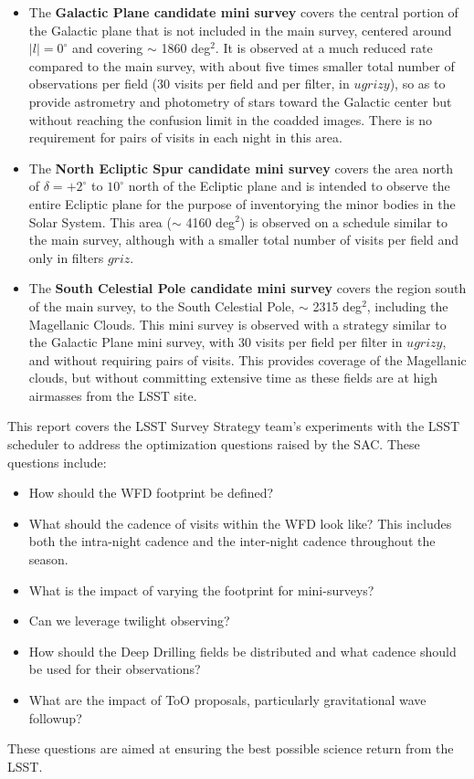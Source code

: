 \begin{itemize}
science, providing a `gold sample' to calibrate the main survey, and to discover Type Ia supernovae.
\item The {\bf Galactic Plane candidate mini survey} covers the central portion of the Galactic plane that is not included in the main survey,
centered around $|l| = 0^\circ$ and covering $\sim$ 1860 deg$^2$.  It is observed at a much reduced rate compared to the main survey,
with about five times smaller total number of observations per field (30 visits per field and per filter, in $ugrizy$), so as to
provide astrometry and photometry of stars toward the Galactic center but without reaching the confusion limit in the coadded images.
There is no requirement for pairs of visits in each night in this area.
\item The {\bf North Ecliptic Spur candidate mini survey} covers the area north of $\delta = +2^\circ$ to $10^\circ$ north of the Ecliptic plane
and is intended to observe the entire Ecliptic plane for the purpose of inventorying the minor bodies in the Solar System. This area ($\sim$ 4160 deg$^2$)
is observed on a schedule similar to the main survey, although with a smaller total number of visits per field and only in filters $griz$.
\item The {\bf South Celestial Pole candidate mini survey} covers the region south of the main survey, to the South Celestial Pole, $\sim$ 2315 deg$^2$,
including the Magellanic Clouds.
This mini survey is observed with a strategy similar to the Galactic Plane mini survey, with 30 visits per field per filter in $ugrizy$,
and without requiring pairs of visits. This provides coverage of the Magellanic clouds, but without committing extensive time as these fields are
at high airmasses from the LSST site.
\end{itemize}

This report covers the LSST Survey Strategy team's experiments with the LSST scheduler to address the optimization questions raised by the SAC. These questions include:
\begin{itemize}
\item How should the WFD footprint be defined?
\item What should the cadence of visits within the WFD look like? This includes both the intra-night cadence and the inter-night cadence throughout the season.
\item What is the impact of varying the footprint for mini-surveys?
\item Can we leverage twilight observing?
\item How should the Deep Drilling fields be distributed and what cadence should be used for their observations?
\item What are the impact of ToO proposals, particularly gravitational wave followup?
\end{itemize}

These questions are aimed at ensuring the best possible science return from the LSST.
